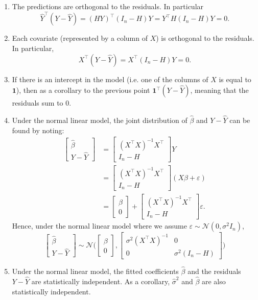 \begin{enumerate}
\item The predictions are orthogonal to the residuals. In particular \[\hat{Y}^\top ( Y - \hat{Y} ) = (HY)^\top (I_n -H) Y = Y^\top H (I_n -H) Y =0.\]
\item Each covariate (represented by a column of $X$) is orthogonal to the residuals. In particular, $$X^\top (Y- \hat{Y}) = X^\top (I_n -H) Y =0.$$
\item If there is an intercept in the model (i.e. one of the columns of $X$ is equal to $\bm{1}$), then as a corollary to the previous point $\bm{1}^\top (Y-\hat{Y})$, meaning that the residuals sum to $0$.
\item Under the normal linear model, the joint distribution of $\hat{\beta}$ and $Y- \hat{Y}$ can be found by noting:
\begin{align}\label{eq:est_resid_decomp}
\begin{bmatrix} \hat{\beta} \\ Y - \hat{Y} \end{bmatrix} &= \begin{bmatrix} (X^\top  X)^{-1} X^\top  \\ I_n - H \end{bmatrix} Y\nonumber\\
& =\begin{bmatrix} (X^\top X)^{-1} X^\top \\ I_n - H \end{bmatrix} (X \beta + \varepsilon)\nonumber\\
& = \begin{bmatrix} \beta \\ 0 \end{bmatrix} +  \begin{bmatrix} (X^\top X)^{-1} X^\top \\ I_n - H \end{bmatrix} \varepsilon.
\end{align} 
Hence, under the normal linear model where we assume $\varepsilon \sim \mathcal{N} (0, \sigma^2 I_n)$, $$\begin{bmatrix} \hat{\beta} \\ Y - \hat{Y} \end{bmatrix}  \sim \mathcal{N} \Bigg( \begin{bmatrix} \beta \\ 0 \end{bmatrix} , \begin{bmatrix} \sigma^2 (X^\top  X)^{-1} & 0 \\ 0 & \sigma^2 (I_n - H) \end{bmatrix} \Bigg)$$
\item Under the normal linear model, the fitted coefficients $\hat{\beta}$ and the residuals $Y- \hat{Y}$ are statistically independent. As a corollary, $\hat{\sigma}^2$ and $\hat{\beta}$ are also statistically independent.
\end{enumerate}


